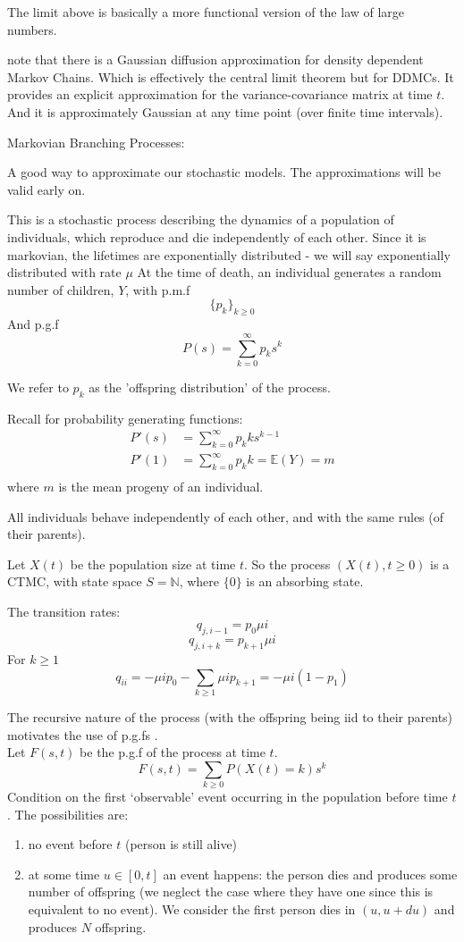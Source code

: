 \documentclass{X:/Documents/Coding/Latex/myassignment}
\begin{document}
The limit above is basically a more functional version of the law of large numbers.

note that there is a Gaussian diffusion approximation for density dependent Markov Chains. Which is effectively the central limit theorem but for DDMCs. It provides an explicit approximation for the variance-covariance matrix at time $t$. And it is approximately Gaussian at any time point (over finite time intervals).



Markovian Branching Processes:

A good way to approximate our stochastic models. The approximations will be valid early on.


This is a stochastic process describing the dynamics of a population of individuals, which reproduce and die independently of each other. Since it is markovian, the lifetimes are exponentially distributed - we will say exponentially distributed with rate $\mu$
At the time of death, an individual generates a random number of children, $Y$, with p.m.f
\[\{p_{k}\}_{k\geq0}\]
And p.g.f
\[P(s) = \sum_{k=0}^\infty p_k s^k\]

We refer to $p_k$ as the 'offspring distribution' of the process.

Recall for probability generating functions:
\begin{align*}
    P'(s) &= \sum_{k=0}^\infty p_k k s^{k-1}\\
    P'(1) &=\sum_{k=0}^\infty p_k k = \mathbb{E}(Y)=m\\
\end{align*}
where $m$ is the mean progeny of an individual.

All individuals behave independently of each other, and with the same rules (of their parents).

Let $X(t)$ be the population size at time $t$. So the process $(X(t), t \geq 0)$ is a CTMC, with state space $S = \mathbb{N}$, where $\{0\}$ is an absorbing state.

The transition rates:
\[q_{j,i-1} = p_0\mu i\]
\[q_{j,i+k} = p_{k+1}\mu i\]
For $k \geq 1$
\[q_{ii} = -\mu i p_0 - \sum_{k\geq1} \mu i p_{k+1} = -\mu i(1-p_1)\]

The recursive nature of the process (with the offspring being iid to their parents) motivates the use of p.g.fs .\\
Let $F(s,t)$ be the p.g.f of the process at time $t$.
\[F(s,t) = \sum_{k\geq0} P(X(t) = k)s^k\]
Condition on the first `observable' event occurring in the population before time $t$. The possibilities are: 
\begin{enumerate}
    \item no event before $t$ (person is still alive)
    \item at some time $u \in [0,t]$ an event happens: the person dies and produces some number of offspring (we neglect the case where they have one since this is equivalent to no event). We consider the first person dies in $(u,u+du)$ and produces $N$ offspring. 
\end{enumerate}
\end{document}

